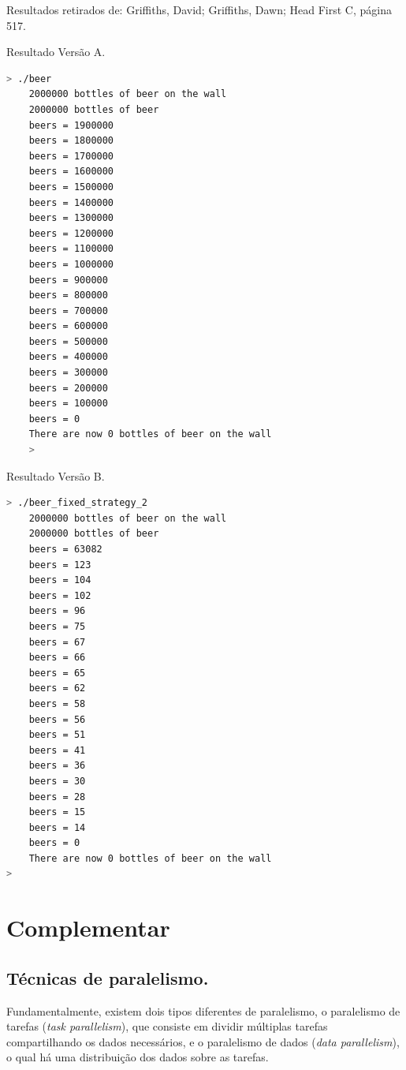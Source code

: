 Resultados retirados de: Griffiths, David; Griffiths, Dawn; Head First
C, página 517.

Resultado Versão A.

\begin{lstlisting}[language=bash]
    > ./beer
    2000000 bottles of beer on the wall
    2000000 bottles of beer
    beers = 1900000
    beers = 1800000
    beers = 1700000
    beers = 1600000
    beers = 1500000
    beers = 1400000
    beers = 1300000
    beers = 1200000
    beers = 1100000
    beers = 1000000
    beers = 900000
    beers = 800000
    beers = 700000
    beers = 600000
    beers = 500000
    beers = 400000
    beers = 300000
    beers = 200000
    beers = 100000
    beers = 0
    There are now 0 bottles of beer on the wall
    >
\end{lstlisting}



Resultado Versão B.

\begin{lstlisting}[language=bash]
    > ./beer_fixed_strategy_2
    2000000 bottles of beer on the wall
    2000000 bottles of beer
    beers = 63082
    beers = 123
    beers = 104
    beers = 102
    beers = 96
    beers = 75
    beers = 67
    beers = 66
    beers = 65
    beers = 62
    beers = 58
    beers = 56
    beers = 51
    beers = 41
    beers = 36
    beers = 30
    beers = 28
    beers = 15
    beers = 14
    beers = 0
    There are now 0 bottles of beer on the wall
>

\end{lstlisting}



\hypertarget{complementar-2}{%
\section{Complementar}\label{complementar-2}}

\hypertarget{tuxe9cnicas-de-paralelismo.}{%
\subsection{Técnicas de
paralelismo.}\label{tuxe9cnicas-de-paralelismo.}}

Fundamentalmente, existem dois tipos diferentes de paralelismo, o
paralelismo de tarefas (\emph{task parallelism}), que consiste em
dividir múltiplas tarefas compartilhando os dados necessários, e o
paralelismo de dados (\emph{data parallelism}), o qual há uma
distribuição dos dados sobre as tarefas.


